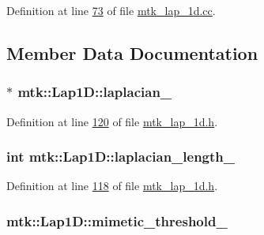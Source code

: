 Definition at line \hyperlink{mtk__lap__1d_8cc_source_l00073}{73} of file \hyperlink{mtk__lap__1d_8cc_source}{mtk\-\_\-lap\-\_\-1d.\-cc}.



\subsection{Member Data Documentation}
\hypertarget{classmtk_1_1Lap1D_a64a3977527c00b4ef994d1bd549f82fd}{
\subsubsection[{laplacian\-\_\-}]{$\ast$ mtk\-::\-Lap1\-D\-::laplacian\-\_\-\hspace{0.3cm}{\ttfamily [private]}}}\label{classmtk_1_1Lap1D_a64a3977527c00b4ef994d1bd549f82fd}


Definition at line \hyperlink{mtk__lap__1d_8h_source_l00120}{120} of file \hyperlink{mtk__lap__1d_8h_source}{mtk\-\_\-lap\-\_\-1d.\-h}.

\hypertarget{classmtk_1_1Lap1D_a05578b0729f2bb4fe8bb442fc555fa80}{
\subsubsection[{laplacian\-\_\-length\-\_\-}]{\setlength{\rightskip}{0pt plus 5cm}int mtk\-::\-Lap1\-D\-::laplacian\-\_\-length\-\_\-\hspace{0.3cm}{\ttfamily [private]}}}\label{classmtk_1_1Lap1D_a05578b0729f2bb4fe8bb442fc555fa80}


Definition at line \hyperlink{mtk__lap__1d_8h_source_l00118}{118} of file \hyperlink{mtk__lap__1d_8h_source}{mtk\-\_\-lap\-\_\-1d.\-h}.

\hypertarget{classmtk_1_1Lap1D_a20dce13067774c64dff892323d9c586e}{
\subsubsection[{mimetic\-\_\-threshold\-\_\-}]{ mtk\-::\-Lap1\-D\-::mimetic\-\_\-threshold\-\_\-\hspace{0.3cm}{\ttfamily [private]}}}\label{classmtk_1_1Lap1D_a20dce13067774c64dff892323d9c586e}


